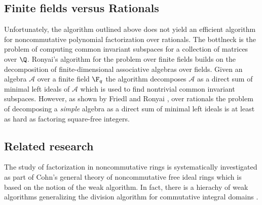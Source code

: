 %

\subsection{Finite fields versus Rationals}\label{finite-vs-rationals}

Unfortunately, the algorithm outlined above does not yield an
efficient algorithm for noncommutative polynomial factorization over
rationals. The bottlneck is the problem of computing common invariant
subspaces for a collection of matrices over $\Q$. Ronyai's algorithm
for the problem over finite fields \cite{Ronyai2} builds on the
decomposition of finite-dimensional associative algebras over
fields. Given an algebra $\mathcal{A}$ over a finite field $\F_q$ the
algorithm decomposes $\mathcal{A}$ as a direct sum of minimal left
ideals of $\mathcal{A}$ which is used to find nontrivial common
invariant subspaces. However, as shown by Friedl and Ronyai
\cite{FR85}, over rationals the problem of decomposing a \emph{simple}
algebra as a direct sum of minimal left ideals is at least as hard as
factoring square-free integers.


\subsection{Related research}

The study of factorization in noncommutative rings is systematically
investigated as part of Cohn's general theory of noncommutative free
ideal rings \cite{Cohnfir,Cohnintro} which is based on the notion of
the weak algorithm. In fact, there is a hierachy of weak algorithms
generalizing the division algorithm for commutative integral domains
\cite{Cohnfir}.\smallskip

